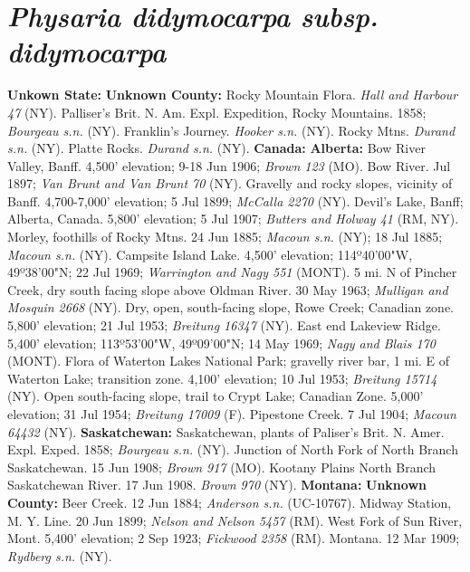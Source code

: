 \section*{\textit{Physaria didymocarpa subsp. didymocarpa}}

  \textbf{Unkown State:}
  \textbf{Unknown County:}
Rocky Mountain Flora. \textit{Hall and Harbour 47} (NY).
Palliser's Brit. N. Am. Expl. Expedition, Rocky Mountains. 1858;
\textit{Bourgeau s.n.} (NY).
Franklin's Journey. \textit{Hooker s.n.} (NY).
Rocky Mtns. \textit{Durand s.n.} (NY).
Platte Rocks. \textit{Durand s.n.} (NY).
  \textbf{Canada:}
  \textbf{Alberta:}
Bow River Valley, Banff. 4,500' elevation; 9-18 Jun 1906;
\textit{Brown 123} (MO).
Bow River. Jul 1897; \textit{Van Brunt and Van Brunt 70} (NY).
Gravelly and rocky slopes, vicinity of Banff. 4,700-7,000' elevation;
5 Jul 1899; \textit{McCalla 2270} (NY).
Devil's Lake, Banff; Alberta, Canada. 5,800' elevation; 5 Jul 1907;
\textit{Butters and Holway 41} (RM, NY).
Morley, foothills of Rocky Mtns. 24 Jun 1885; \textit{Macoun s.n.} (NY);
18 Jul 1885; \textit{Macoun s.n.} (NY).
Campsite Island Lake. 4,500' elevation; 114º40'00"W, 49º38'00"N;
22 Jul 1969; \textit{Warrington and Nagy 551} (MONT).
5 mi. N of Pincher Creek, dry south facing slope above Oldman River.
30 May 1963; \textit{Mulligan and Mosquin 2668} (NY).
Dry, open, south-facing slope, Rowe Creek; Canadian zone. 5,800' elevation;
21 Jul 1953; \textit{Breitung 16347} (NY).
East end Lakeview Ridge. 5,400' elevation; 113º53'00"W, 49º09'00"N; 14 May 1969;
\textit{Nagy and Blais 170} (MONT).
Flora of Waterton Lakes National Park; gravelly river bar, 1 mi. E of Waterton
Lake; transition zone. 4,100' elevation; 10 Jul 1953;
\textit{Breitung 15714} (NY).
Open south-facing slope, trail to Crypt Lake; Canadian Zone. 5,000' elevation;
31 Jul 1954; \textit{Breitung 17009} (F).
Pipestone Creek. 7 Jul 1904; \textit{Macoun 64432} (NY).
  \textbf{Saskatchewan:}
Saskatchewan, plants of Paliser's Brit. N. Amer. Expl. Exped. 1858;
\textit{Bourgeau s.n.} (NY).
Junction of North Fork of North Branch Saskatchewan. 15 Jun 1908;
\textit{Brown 917} (MO).
Kootany Plains North Branch Saskatchewan River. 17 Jun 1908.
\textit{Brown 970} (NY).
  \textbf{Montana:}
  \textbf{Unknown County:}
Beer Creek. 12 Jun 1884; \textit{Anderson s.n.} (UC-10767).
Midway Station, M. Y. Line. 20 Jun 1899; \textit{Nelson and Nelson 5457} (RM).
West Fork of Sun River, Mont. 5,400' elevation; 2 Sep 1923;
\textit{Fickwood 2358} (RM).
Montana. 12 Mar 1909; \textit{Rydberg s.n.} (NY).
